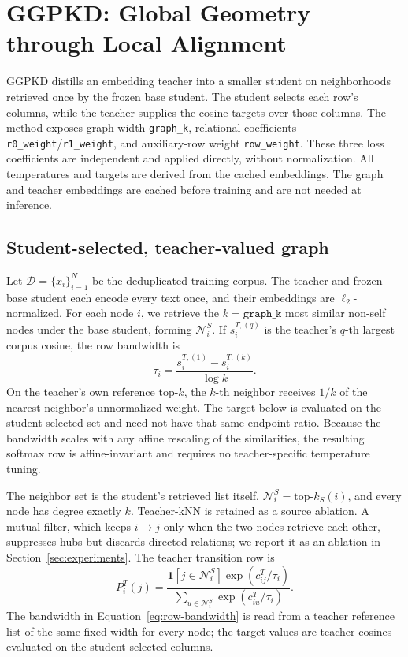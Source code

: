 \section{GGPKD: Global Geometry through Local Alignment}
\label{sec:method}

GGPKD distills an embedding teacher into a smaller student on neighborhoods
retrieved once by the frozen base student. The student selects each row's
columns, while the teacher supplies the cosine targets over those columns. The
method exposes graph width \texttt{graph\_k}, relational coefficients
\texttt{r0\_weight}/\texttt{r1\_weight}, and auxiliary-row weight
\texttt{row\_weight}. These three loss coefficients are independent and applied
directly, without normalization. All temperatures and targets are
derived from the cached embeddings. The graph and teacher embeddings are cached before training and are not needed at
inference.

\subsection{Student-selected, teacher-valued graph}
\label{sec:graph}

Let $\mathcal D=\{x_i\}_{i=1}^{N}$ be the deduplicated training corpus. The
teacher and frozen base student each encode every text once, and their embeddings
are $\ell_2$-normalized. For each node $i$, we retrieve the
$k=\texttt{graph\_k}$ most similar non-self nodes under the base student,
forming $\mathcal N_i^S$. If $s_i^{T,(q)}$ is the teacher's $q$-th largest
corpus cosine, the row bandwidth is
\begin{equation}
\tau_i=\frac{s_i^{T,(1)}-s_i^{T,(k)}}{\log k}.
\label{eq:row-bandwidth}
\end{equation}
On the teacher's own reference top-$k$, the $k$-th neighbor receives $1/k$ of
the nearest neighbor's unnormalized weight. The target below is evaluated on
the student-selected set and need not have that same endpoint ratio. Because
the bandwidth scales with any affine
rescaling of the similarities, the resulting softmax row is affine-invariant
and requires no teacher-specific temperature tuning.

The neighbor set is the student's retrieved list itself,
$\mathcal N_i^S=\mathrm{top}\text{-}k_S(i)$, and every node has degree exactly
$k$. Teacher-kNN is retained as a source ablation. A mutual
filter, which keeps $i\rightarrow j$ only when the two nodes retrieve each
other, suppresses hubs but discards directed relations; we report it as
an ablation in Section~\ref{sec:experiments}. The teacher transition row is
\begin{equation}
P_i^T(j)
=\frac{\mathbf 1[j\in\mathcal N_i^S]\exp(c_{ij}^T/\tau_i)}
{\sum_{u\in\mathcal N_i^S}\exp(c_{iu}^T/\tau_i)}.
\label{eq:teacher-transition}
\end{equation}
The bandwidth in Equation~\eqref{eq:row-bandwidth} is read from a teacher
reference list of the same fixed width for every node; the target values are
teacher cosines evaluated on the student-selected columns.

